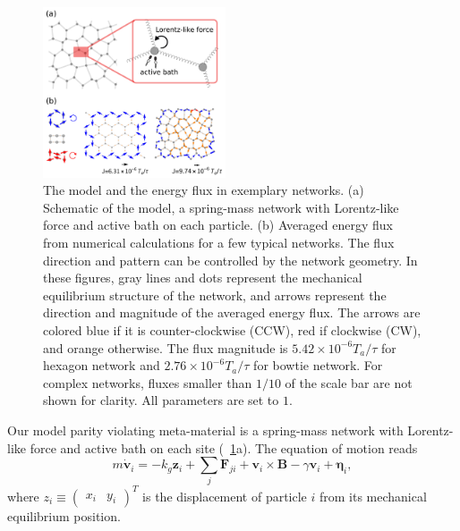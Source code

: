 \documentclass[
 preprint,
 preprintnumbers,
 amsmath,amssymb,
 aps,
 pre,
 longbibliography,
 superscriptaddress,
 10pt, twocolumn
]{revtex4-1}
\begin{document}
\begin{figure}[ht]
	\centering
	\includegraphics[width=0.48\textwidth]{model_and_result.pdf}
    \caption{
    The model and the energy flux in exemplary networks.
    (a) Schematic of the model, a spring-mass network with Lorentz-like force and active bath on each particle.
    (b) Averaged energy flux from numerical calculations for a few typical networks. The flux direction and pattern can be controlled by the network geometry. In these figures, gray lines and dots represent the mechanical equilibrium structure of the network, and arrows represent the direction and magnitude of the averaged energy flux. The arrows are colored blue if it is counter-clockwise (CCW), red if clockwise (CW), and orange otherwise. The flux magnitude is $5.42\times 10^{-6} T_a/\tau$ for hexagon network and $2.76\times 10^{-6} T_a/\tau$ for bowtie network. For complex networks, fluxes smaller than $1/10$ of the scale bar are not shown for clarity. All parameters are set to $1$.
    }
    \label{fig:model_and_result}
\end{figure}

Our model parity violating meta-material is a spring-mass network with Lorentz-like force and active bath \cite{Fodor2016HowFar} on each site (\figurename~\ref{fig:model_and_result}a).
The equation of motion reads
\begin{equation} \label{eqn:GLE_single}
    m\dot{\bm{v}}_i = -k_g \bm{z}_i + \sum_j\bm{F}_{ji} + \bm{v}_i\times\bm{B} - \gamma\bm{v}_i + \bm{\eta}_i ,
\end{equation}
where $z_i \equiv \begin{pmatrix} x_i & y_i \end{pmatrix}^T$ is the displacement of particle $i$ from its mechanical equilibrium position.
\end{document}
